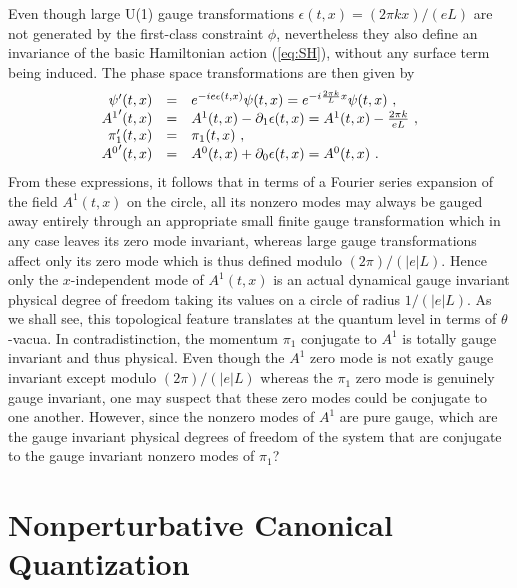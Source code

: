\documentclass[a4paper,11pt]{article}
\begin{document}
Even though large U(1) gauge transformations $\epsilon(t,x)=(2\pi kx)/(eL)$
are not generated by the first-class constraint $\phi$, nevertheless they
also define an invariance of the basic Hamiltonian action (\ref{eq:SH}),
without any surface term being induced. The phase space transformations are 
then given by
\begin{equation}
\begin{array}{r c l}
\psi'(t,x)&=&e^{-ie\epsilon(t,x)}\psi(t,x)=e^{-i\frac{2\pi k}{L}x}\psi(t,x)\ ,\\
{A^1}'(t,x)&=&A^1(t,x)-\partial_1\epsilon(t,x)=A^1(t,x)-\frac{2\pi k}{eL}\ ,\\
\pi'_1(t,x)&=&\pi_1(t,x)\ ,\ \\
{A^0}'(t,x)&=&A^0(t,x)+\partial_0\epsilon(t,x)=A^0(t,x)\ .
\end{array}
\end{equation}
From these expressions, it follows that in terms of a Fourier series
expansion of the field $A^1(t,x)$ on the circle, all its nonzero modes may 
always be gauged away entirely through an appropriate small finite gauge 
transformation which in any case leaves its zero mode invariant, 
whereas large gauge transformations affect only its zero mode which is 
thus defined modulo $(2\pi)/(|e|L)$. Hence only the $x$-independent 
mode of $A^1(t,x)$ is an actual dynamical gauge invariant physical degree of
freedom taking its values on a circle of radius 
$1/(|e|L)$.\cite{Manton,Hetrick}
As we shall see, this topological feature translates at the quantum level
in terms of $\theta$-vacua. In contradistinction, the momentum $\pi_1$
conjugate to $A^1$ is totally gauge invariant and thus physical.
Even though the $A^1$ zero mode is not exatly gauge invariant except
modulo $(2\pi)/(|e|L)$ whereas the $\pi_1$ zero mode is genuinely gauge
invariant, one may suspect that these zero modes could be conjugate to
one another. However, since the nonzero modes of $A^1$ are pure gauge, 
which are the gauge invariant physical degrees of freedom of the system that 
are conjugate to the gauge invariant nonzero modes of $\pi_1$?

\section{Nonperturbative Canonical Quantization}
\label{Sect4}
\end{document}
